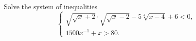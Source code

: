 Solve the system of inequalities
\[\begin{cases}\sqrt{\sqrt x+2}\cdot\sqrt{\sqrt x-2}-5\sqrt[4]{x-4}+6<0,\\[2pt] 1500x^{-1}+x>80.\end{cases}\]
